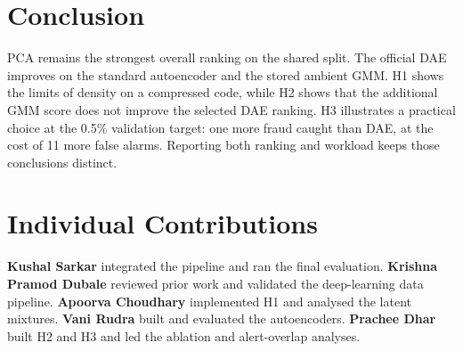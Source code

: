 \section{Conclusion}
PCA remains the strongest overall ranking on the shared split. The official DAE improves on the standard autoencoder and the stored ambient GMM. H1 shows the limits of density on a compressed code, while H2 shows that the additional GMM score does not improve the selected DAE ranking. H3 illustrates a practical choice at the 0.5\% validation target: one more fraud caught than DAE, at the cost of 11 more false alarms. Reporting both ranking and workload keeps those conclusions distinct.

\section{Individual Contributions}
\textbf{Kushal Sarkar} integrated the pipeline and ran the final evaluation. \textbf{Krishna Pramod Dubale} reviewed prior work and validated the deep-learning data pipeline. \textbf{Apoorva Choudhary} implemented H1 and analysed the latent mixtures. \textbf{Vani Rudra} built and evaluated the autoencoders. \textbf{Prachee Dhar} built H2 and H3 and led the ablation and alert-overlap analyses.




